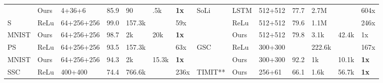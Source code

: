 \documentclass[fleqn,10pt]{wlscirep}
\begin{document}
\begin{table}[]
{\begin{tabular}{|l|l|l|l|l|l|l|l|l|l|l|l|l|l|}
                      & \cellcolor{green}Ours                    & \cellcolor{green}4+36+6                   & \cellcolor{green}85.9                 & \cellcolor{green}90              & \cellcolor{green}.5k            & \cellcolor{green}\bf 1x                     & \multirow{3}{*}{SoLi} & LSTM                    & 512+512                  & 77.7                & 2.7M            &                & 604x                 \\ \cline{1-7} \cline{9-14} 
S                     & ReLu                    & 64+256+256               & 99.0                & 157.3k          &                & 59x                  &                       & ReLu                    & 512+512                  & 79.6                & 1.1M            &                & 246x                   \\ \cline{2-7} \cline{9-14} 
MNIST                 & \cellcolor{green}Ours                    & \cellcolor{green}64+256+256               & \cellcolor{green}98.7                & \cellcolor{green}2k            & \cellcolor{green}20k           & \cellcolor{green}\bf 1x                     &                       & \cellcolor{green}Ours                    & \cellcolor{green}512+512                  & \cellcolor{green}79.8                & \cellcolor{green}3.1k            & \cellcolor{green}42.4k          & \cellcolor{green}1x                     \\ \hline
PS                    & ReLu                    & 64+256+256                & 93.5                & 157.3k          &                & 63x                  & \multirow{2}{*}{GSC}  & 
ReLu                    & 300+300                  &                      & 222.6k          &                & 167x  
\\ \cline{2-7} \cline{9-14} 
MNIST                 & \cellcolor{green}Ours                    & \cellcolor{green}64+256+256               & \cellcolor{green}94.3                & \cellcolor{green}2k            & \cellcolor{green}15.3k          & \cellcolor{green}\bf 1x                     &                       & \cellcolor{green}Ours                    & \cellcolor{green}300+300                  & \cellcolor{green}92.2                & \cellcolor{green}1k            & \cellcolor{green}10.1k          & \cellcolor{green}\bf 1x                  \\ \cline{1-14} 
\multirow{2}{*}{SSC}  & ReLu                    & 400+400                  & 74.4                & 766.6k          &                & 236x                 &                       
\multirow{2}{*}{TIMIT**}                & \multirow{2}{*}{Ours }                  & \multirow{2}{*}{256+61 }               & \multirow{2}{*}{66.1}                & \multirow{2}{*}{1.6k }           & \multirow{2}{*}{56.7k}          & \multirow{2}{*}{\bf 1x }                    \\ \cline{2-7}  


\end{tabular}}
\end{table}
\end{document}
